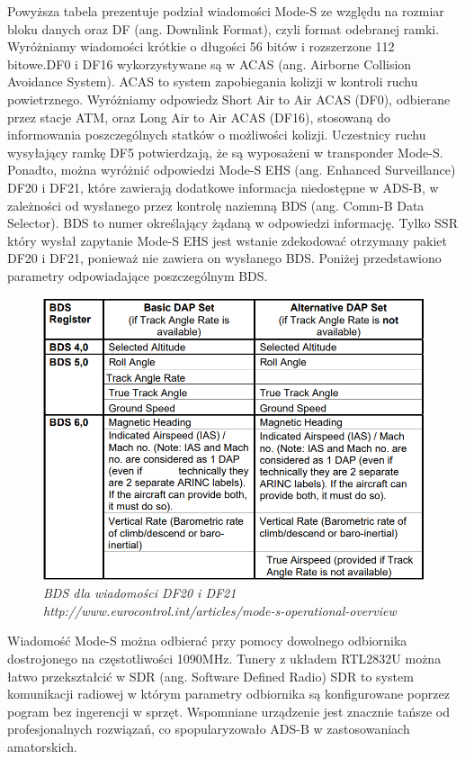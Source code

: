 \documentclass[eng,printmode]{mgr}
\begin{document}
Powyższa tabela prezentuje podział wiadomości Mode-S ze względu na rozmiar bloku danych oraz DF (ang. Downlink Format), czyli format odebranej ramki. Wyróżniamy wiadomości krótkie o długości 56 bitów i rozszerzone 112 bitowe.DF0 i DF16 wykorzystywane są w ACAS (ang. Airborne Collision Avoidance System). ACAS to system zapobiegania kolizji w kontroli ruchu powietrznego. Wyróżniamy odpowiedz Short Air to Air ACAS (DF0), odbierane przez stacje ATM, oraz Long Air to Air ACAS (DF16), stosowaną do informowania poszczególnych statków o możliwości kolizji. Uczestnicy ruchu wysyłający ramkę DF5 potwierdzają, że są wyposażeni w transponder Mode-S. Ponadto, można wyróżnić odpowiedzi Mode-S EHS (ang. Enhanced Surveillance) DF20 i DF21, które zawierają dodatkowe informacja niedostępne w ADS-B, w zależności od wysłanego przez kontrolę naziemną BDS (ang. Comm-B Data Selector). BDS to numer określający żądaną w odpowiedzi informację. Tylko SSR który wysłał zapytanie Mode-S EHS jest wstanie zdekodować otrzymany pakiet DF20 i DF21, ponieważ nie zawiera on wysłanego BDS. Poniżej przedstawiono parametry odpowiadające poszczególnym BDS.
\begin{figure}[ph]
  \centering
  \includegraphics[width=\textwidth]{images/bds.png}
  \caption{\textit{ BDS dla wiadomości DF20 i DF21 \\http://www.eurocontrol.int/articles/mode-s-operational-overview}}
\end{figure}

Wiadomość Mode-S można odbierać przy pomocy dowolnego odbiornika dostrojonego na częstotliwości 1090MHz. Tunery z układem RTL2832U można łatwo przekształcić w SDR (ang. Software Defined Radio) SDR to system komunikacji radiowej w którym parametry odbiornika są konfigurowane poprzez pogram bez ingerencji w sprzęt. Wspomniane urządzenie jest znacznie tańsze od profesjonalnych rozwiązań, co spopularyzowało ADS-B w zastosowaniach amatorskich. 
\end{document}
